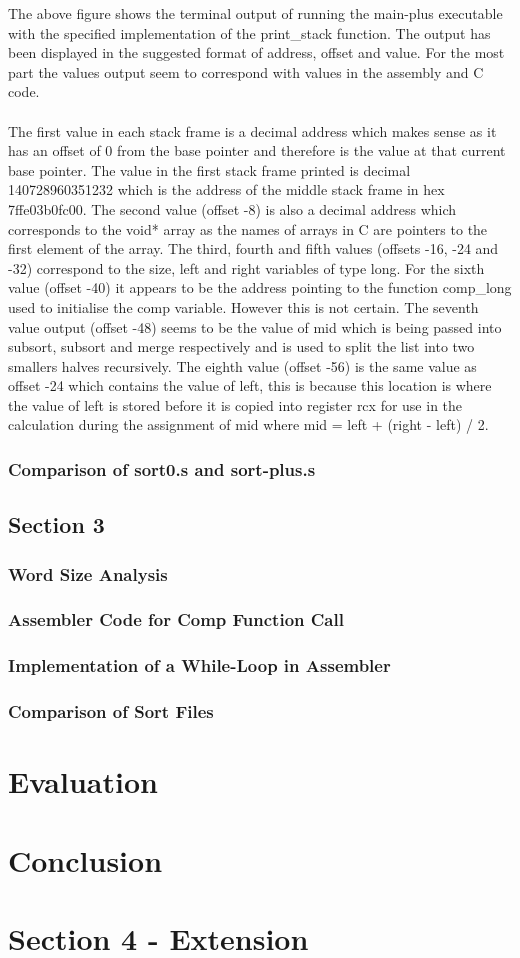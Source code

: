 \documentclass[11]{article}
\begin{document}
			The above figure shows the terminal output of running the main-plus executable with the specified implementation of the print\_stack function. The output has been displayed in the suggested format of address, offset and value. For the most part the values output seem to correspond with values in the assembly and C code.\\\\ The first value in each stack frame is a decimal address which makes sense as it has an offset of 0 from the base pointer and therefore is the value at that current base pointer. The value in the first stack frame printed is decimal 140728960351232 which is the address of the middle stack frame in hex 7ffe03b0fc00. The second value (offset -8) is also a decimal address which corresponds to the void* array as the names of arrays in C are pointers to the first element of the array. The third, fourth and fifth values (offsets -16, -24 and -32) correspond to the size, left and right variables of type long. For the sixth value (offset -40) it appears to be the address pointing to the function comp\_long used to initialise the comp variable. However this is not certain. The seventh value output (offset -48) seems to be the value of mid which is being passed into subsort, subsort and merge respectively and is used to split the list into two smallers halves recursively. The eighth value (offset -56) is the same value as offset -24 which contains the value of left, this is because this location is where the value of left is stored before it is copied into register rcx for use in the calculation during the assignment of mid where mid = left + (right - left) / 2. 
			\subsubsection{Comparison of sort0.s and sort-plus.s}
		\subsection{Section 3}
			\subsubsection{Word Size Analysis}
			\subsubsection{Assembler Code for Comp Function Call}
			\subsubsection{Implementation of a While-Loop in Assembler}
			\subsubsection{Comparison of Sort Files}
	\section{Evaluation}
	\section{Conclusion}
	\section{Section 4 - Extension}
\end{document}
